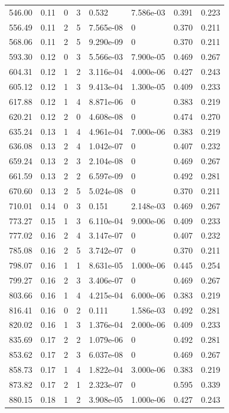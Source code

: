 \documentclass[preview]{standalone}
\begin{document}
{{{\begin{tabular}{L{1.2cm}C{1.2cm} C{0.3cm}C{0.5cm} C{1.4cm}C{1.4cm} C{1.4cm}C{1.4cm}}
  546.00  &  0.11  & 0     &  3 &  0.532  & 7.586e-03  & 0.391 &  0.223   \\ 
  556.49  &  0.11  & 2     &  5 &  7.565e-08  & 0  & 0.370 &  0.211   \\ 
  568.06  &  0.11  & 2     &  5 &  9.290e-09  & 0  & 0.370 &  0.211   \\ 
  593.30  &  0.12  & 0     &  3 &  5.566e-03  & 7.900e-05  & 0.469 &  0.267   \\ 
  604.31  &  0.12  & 1     &  2 &  3.116e-04  & 4.000e-06  & 0.427 &  0.243   \\ 
  605.12  &  0.12  & 1     &  3 &  9.413e-04  & 1.300e-05  & 0.409 &  0.233   \\ 
  617.88  &  0.12  & 1     &  4 &  8.871e-06  & 0  & 0.383 &  0.219   \\ 
  620.21  &  0.12  & 2     &  0 &  4.608e-08  & 0  & 0.474 &  0.270   \\ 
  635.24  &  0.13  & 1     &  4 &  4.961e-04  & 7.000e-06  & 0.383 &  0.219   \\ 
  636.08  &  0.13  & 2     &  4 &  1.042e-07  & 0  & 0.407 &  0.232   \\ 
  659.24  &  0.13  & 2     &  3 &  2.104e-08  & 0  & 0.469 &  0.267   \\ 
  661.59  &  0.13  & 2     &  2 &  6.597e-09  & 0  & 0.492 &  0.281   \\ 
  670.60  &  0.13  & 2     &  5 &  5.024e-08  & 0  & 0.370 &  0.211   \\ 
  710.01  &  0.14  & 0     &  3 &  0.151  & 2.148e-03  & 0.469 &  0.267   \\ 
  773.27  &  0.15  & 1     &  3 &  6.110e-04  & 9.000e-06  & 0.409 &  0.233   \\ 
  777.02  &  0.16  & 2     &  4 &  3.147e-07  & 0  & 0.407 &  0.232   \\ 
  785.08  &  0.16  & 2     &  5 &  3.742e-07  & 0  & 0.370 &  0.211   \\ 
  798.07  &  0.16  & 1     &  1 &  8.631e-05  & 1.000e-06  & 0.445 &  0.254   \\ 
  799.27  &  0.16  & 2     &  3 &  3.406e-07  & 0  & 0.469 &  0.267   \\ 
  803.66  &  0.16  & 1     &  4 &  4.215e-04  & 6.000e-06  & 0.383 &  0.219   \\ 
  816.41  &  0.16  & 0     &  2 &  0.111  & 1.586e-03  & 0.492 &  0.281   \\ 
  820.02  &  0.16  & 1     &  3 &  1.376e-04  & 2.000e-06  & 0.409 &  0.233   \\ 
  835.69  &  0.17  & 2     &  2 &  1.079e-06  & 0  & 0.492 &  0.281   \\ 
  853.62  &  0.17  & 2     &  3 &  6.037e-08  & 0  & 0.469 &  0.267   \\ 
  858.73  &  0.17  & 1     &  4 &  1.822e-04  & 3.000e-06  & 0.383 &  0.219   \\ 
  873.82  &  0.17  & 2     &  1 &  2.323e-07  & 0  & 0.595 &  0.339   \\ 
  880.15  &  0.18  & 1     &  2 &  3.908e-05  & 1.000e-06  & 0.427 &  0.243   \\ 
\hline 
\end{tabular} 

}}}
\end{document}
